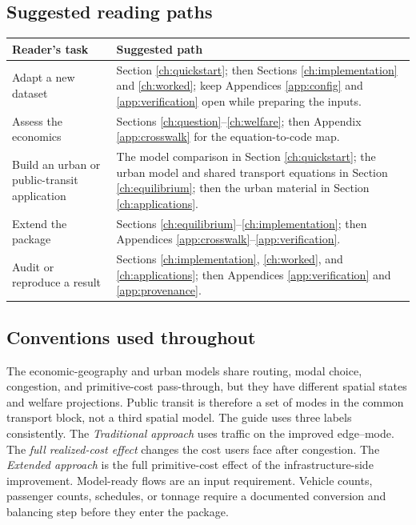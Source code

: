 \subsection*{Suggested reading paths}

\begin{center}
\small
\begin{tabularx}{\textwidth}{L{0.25\textwidth}X}
\toprule
Reader's task & Suggested path \\
\midrule
Adapt a new dataset &
Section \ref{ch:quickstart}; then Sections \ref{ch:implementation} and
\ref{ch:worked}; keep Appendices \ref{app:config} and
\ref{app:verification} open while preparing the inputs. \\
Assess the economics &
Sections \ref{ch:question}--\ref{ch:welfare}; then Appendix
\ref{app:crosswalk} for the equation-to-code map. \\
Build an urban or public-transit application &
The model comparison in Section \ref{ch:quickstart}; the urban model and shared
transport equations in Section \ref{ch:equilibrium}; then the urban material
in Section \ref{ch:applications}. \\
Extend the package &
Sections \ref{ch:equilibrium}--\ref{ch:implementation}; then Appendices
\ref{app:crosswalk}--\ref{app:verification}. \\
Audit or reproduce a result &
Sections \ref{ch:implementation}, \ref{ch:worked}, and
\ref{ch:applications}; then Appendices \ref{app:verification} and
\ref{app:provenance}. \\
\bottomrule
\end{tabularx}
\end{center}

\subsection*{Conventions used throughout}

The economic-geography and urban models share routing, modal choice,
congestion, and primitive-cost pass-through, but they have different spatial
states and welfare projections. Public transit is therefore a set of modes in
the common transport block, not a third spatial model. The guide uses three
labels consistently. The \emph{Traditional approach} uses traffic on the
improved edge--mode.
The \emph{full realized-cost effect} changes the cost users face after
congestion. The \emph{Extended approach} is the full primitive-cost effect of
the infrastructure-side improvement. Model-ready flows are an input
requirement. Vehicle counts, passenger counts, schedules, or tonnage require a
documented conversion and balancing step before they enter the package.
